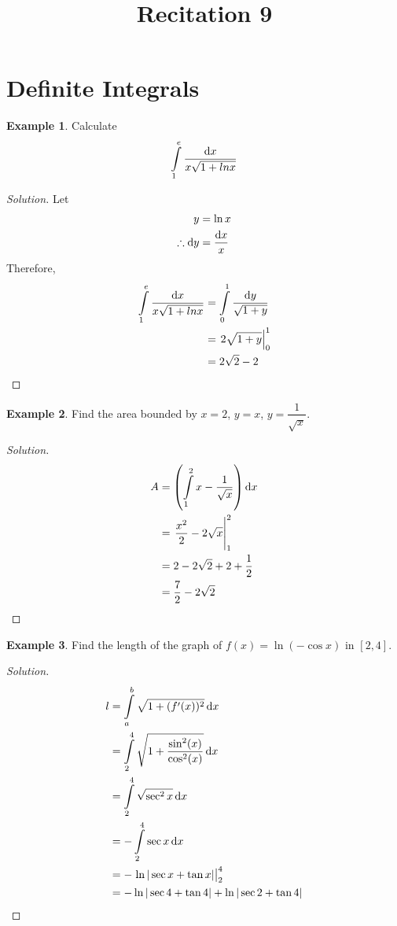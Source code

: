 \documentclass[fleqn, 12pt]{article}
\title{Recitation 9}
\author{}
\date{\formatdate{24}{12}{2014}}
\theoremstyle{definition}
\newtheorem{example}{Example}
\theoremstyle{theorem}
\newenvironment{solution}
{\begin{proof}[Solution]\let\qed\relax}
	{\end{proof}}
\begin{document}
\maketitle

\tableofcontents

\newpage
\section{Definite Integrals}

\begin{example}
	Calculate \[\int\limits_{1}^{e} \dfrac{\dif x}{x \sqrt{1 + ln x}}\]
\end{example}

\begin{solution}
	Let
	\begin{align*}
		y &= \ln x\\
		\therefore \dif y &= \dfrac{\dif x}{x}
	\end{align*}
	Therefore,
	\begin{align*}
		\int\limits_{1}^{e} \dfrac{\dif x}{x \sqrt{1 + ln x}} &= \int\limits_{0}^{1} \dfrac{\dif y}{\sqrt{1 + y}}\\
		&= \left. 2 \sqrt{1 + y} \right\rvert_{0}^{1}\\
		&= 2 \sqrt 2 - 2
	\end{align*}
\end{solution}

\begin{example}
	Find the area bounded by $x = 2$, $y = x$, $y = \dfrac{1}{\sqrt{x}}$.
\end{example}

\begin{solution}
	\begin{align*}
		A &= \left( \int\limits_{1}^{2} x - \dfrac{1}{\sqrt{x}} \right) \dif x\\
		&= \left. \dfrac{x^2}{2} - 2 \sqrt{x} \right\rvert_{1}^{2}\\
		&= 2 - 2 \sqrt{2} + 2 + \dfrac{1}{2}\\
		&= \dfrac{7}{2} - 2 \sqrt{2}
	\end{align*}
\end{solution}

\begin{example}
	Find the length of the graph of	$f(x) = \ln (-\cos x)$ in $[2, 4]$.
\end{example}

\begin{solution}
	\begin{align*}
		l &= \int\limits_{a}^{b} \sqrt{1 + (f'(x))^2} \dif x\\
		&= \int\limits_{2}^{4} \sqrt{1 + \dfrac{\sin^2 (x)}{\cos^2 (x)}} \dif x\\
		&= \int\limits_{2}^{4} \sqrt{\sec^2 x} \dif x\\
		&= -\int\limits_{2}^{4} \sec x \dif x\\
		&=  -\left. \ln |\sec x + \tan x| \right\rvert_{2}^{4}\\
		&= -\ln |\sec 4 + \tan 4| + \ln |\sec 2 + \tan 4|
	\end{align*}
\end{solution}
\end{document}

